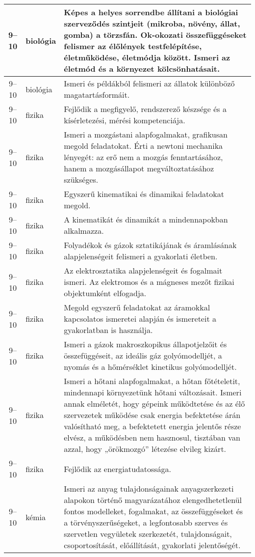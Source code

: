 \begin{small}
\begin{longtable}{c | p{2cm} |  p{11cm} }
              9--10 & biológia & Képes a helyes sorrendbe állítani a biológiai szerveződés szintjeit (mikroba, növény, állat, gomba) a törzsfán. Ok-okozati összefüggéseket felismer az élőlények testfelépítése, életműködése, életmódja között. Ismeri az életmód és a környezet kölcsönhatásait. \\ \hline
              9--10 & biológia & Ismeri és példákból felismeri az állatok különböző magatartásformáit. \\ \hline
              9--10 & fizika & Fejlődik a megfigyelő, rendszerező készsége és a kísérletezési, mérési kompetenciája. \\ \hline
              9--10 & fizika & Ismeri a mozgástani alapfogalmakat, grafikusan megold feladatokat. Érti a newtoni mechanika lényegét: az erő nem a mozgás fenntartásához, hanem a mozgásállapot megváltoztatásához szükséges. \\ \hline
              9--10 & fizika & Egyszerű kinematikai és dinamikai feladatokat megold. \\ \hline
              9--10 & fizika & A kinematikát és dinamikát a mindennapokban alkalmazza. \\ \hline
              9--10 & fizika & Folyadékok és gázok sztatikájának és áramlásának alapjelenségeit felismeri a gyakorlati életben. \\ \hline
              9--10 & fizika & Az elektrosztatika alapjelenségeit és fogalmait ismeri. Az elektromos és a mágneses mezőt fizikai objektumként elfogadja. \\ \hline
              9--10 & fizika & Megold egyszerű feladatokat az áramokkal kapcsolatos ismeretei alapján és ismereteit a gyakorlatban is használja. \\ \hline
              9--10 & fizika & Ismeri a gázok makroszkopikus állapotjelzőit és összefüggéseit, az ideális gáz golyómodelljét, a nyomás és a hőmérséklet kinetikus golyómodelljét. \\ \hline
              9--10 & fizika & Ismeri a hőtani alapfogalmakat, a hőtan főtételetit, mindennapi környezetünk hőtani változásait. Ismeri annak elméletét, hogy gépeink működtetése és az élő szervezetek működése csak energia befektetése árán valósítható meg, a befektetett energia jelentős része elvész, a működésben nem hasznosul, tisztában van azzal, hogy  „örökmozgó” létezése elvileg kizárt. \\ \hline
              9--10 & fizika & Fejlődik az energiatudatossága. \\ \hline
              9--10 & kémia & Ismeri az anyag tulajdonságainak anyagszerkezeti alapokon történő magyarázatához elengedhetetlenül fontos modelleket, fogalmakat, az összefüggéseket és a törvényszerűségeket, a legfontosabb szerves és szervetlen vegyületek szerkezetét, tulajdonságait, csoportosítását, előállítását, gyakorlati jelentőségét. \\ \hline

\end{longtable}
\end{small}
